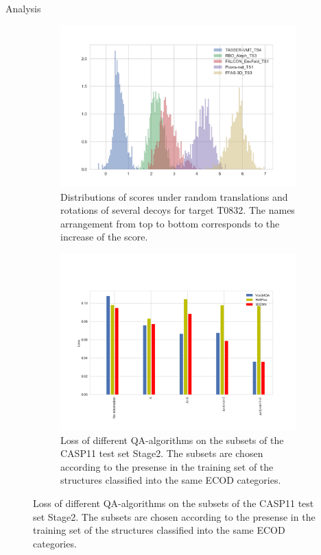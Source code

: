 \documentclass[final, unknownkeysallowed]{beamer}
\makeatletter
\newcommand\nocaption{%
    \renewcommand\p@subfigure{}
    \renewcommand\thesubfigure{\thefigure\alph{subfigure}}
}
\makeatother
\begin{document}
\begin{frame}{}
\begin{textblock}{39.0}
\begin{block}{Analysis}
\begin{figure}[H]
\nocaption
    \centering
    \begin{subfigure}[t]{.5\textwidth}
    \includegraphics[width=\linewidth]{../draft/Fig/decoys_sampling_dist.png}
    \captionsetup{width=\linewidth}
    \caption{Distributions of scores under random translations and
      rotations of several decoys for target T0832. The names
      arrangement from top to bottom corresponds to the increase of
      the score.}
    \label{Fig:DecoysScoreDistribution}
    \end{subfigure}%
    \begin{subfigure}[t]{.5\textwidth}
    \includegraphics[width=\linewidth]{../draft/Fig/LossVsECOD.png}
    \captionsetup{width=\linewidth}
    \caption{Loss of different QA-algorithms on the subsets of the
      CASP11 test set Stage2. The subsets are chosen according to the
      presense in the training set of the structures classified into
      the same ECOD categories.}
    \label{Fig:LossVsECOD}
    \end{subfigure}
\end{figure}


\end{block}
\end{textblock}
\end{frame}
\end{document}

